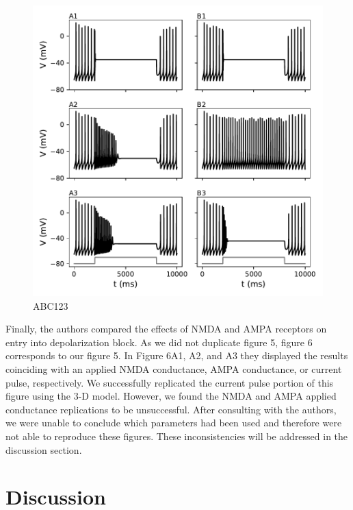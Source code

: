 \begin{figure}
	\centering
	\includegraphics[scale=0.7]{../figures/figure_6.pdf}
	\caption{ABC123}
	\label{fig:6}
\end{figure}

Finally, the authors compared the effects of NMDA and AMPA receptors on entry into depolarization block. As we did not duplicate figure 5, figure 6 corresponds to our figure 5. In Figure 6A1, A2, and A3 they displayed the results coinciding with an applied NMDA conductance, AMPA conductance, or current pulse, respectively. We successfully replicated the current pulse portion of this figure using the 3-D model. However, we found the NMDA and AMPA applied conductance replications to be unsuccessful. After consulting with the authors, we were unable to conclude which parameters had been used and therefore were not able to reproduce these figures. These inconsistencies will be addressed in the discussion section.  

\section{Discussion}

